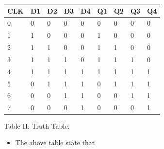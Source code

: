 \documentclass[journal,12pt,twocolumn]{IEEEtran}
\begin{document}
\begin{center}
    
    \setlength{\arrayrulewidth}{0.5mm}
\setlength{\tabcolsep}{18pt}
\renewcommand{\arraystretch}{1}
\begin{tabular}{|l|l|l|l|l|l|l|l|l|}
\hline
\textbf{CLK} & \textbf{D1} & \textbf{D2} & \textbf{D3} & \textbf{D4} & \textbf{Q1} & \textbf{Q2} & \textbf{Q3} & \textbf{Q4} \\ \hline
0            & 0           & 0           & 0           & 0           & 0           & 0           & 0           & 0           \\ \hline
1            & 1           & 0           & 0           & 0           & 1           & 0           & 0           & 0           \\ \hline
2            & 1           & 1           & 0           & 0           & 1           & 1           & 0           & 0           \\ \hline
3            & 1           & 1           & 1           & 0           & 1           & 1           & 1           & 0           \\ \hline
4            & 1           & 1           & 1           & 1           & 1           & 1           & 1           & 1           \\ \hline
5            & 0           & 1           & 1           & 1           & 0           & 1           & 1           & 1           \\ \hline
6            & 0           & 0           & 1           & 1           & 0           & 0           & 1           & 1           \\ \hline
7            & 0           & 0           & 0           & 1           & 0           & 0           & 0           & 1           \\ \hline
\end{tabular}
   
   \vspace{0.5cm}
   \centering Table II: Truth Table.
\label{table:2}
 \end{center}
 \begin{itemize}
 \item The above table state that
 \end{itemize}
\end{document}
